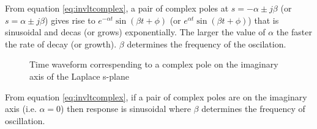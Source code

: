 \documentclass[11pt]{article} %
\theoremstyle{definition}
\begin{document}
	From equation \ref{eq:invltcomplex}, a pair of complex poles at $s=-\alpha \pm j\beta$ (or $s=\alpha \pm j\beta$) gives rise to $e^{-\alpha t}\sin{(\beta t+\phi)}$ (or $e^{\alpha t}\sin{(\beta t+\phi)}$) that is sinusoidal and decas (or grows) exponentially. The larger the value of $\alpha$ the faster the rate of decay (or growth). $\beta$ determines the frequency of the oscilation.

	\begin{figure}[H]
		\centering
		\caption{Time waveform correspending to a complex pole on the imaginary axis of the Laplace s-plane}
	\end{figure}
	From equation \ref{eq:invltcomplex}, if a pair of complex poles are on the imaginary axis (i.e. $\alpha=0$) then response is sinusoidal where $\beta$ determines the frequency of oscillation.
\end{document}
